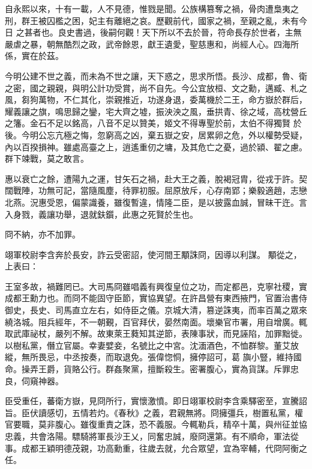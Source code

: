 \begin{pinyinscope}
 自永熙以來，十有一載，人不見德，惟戮是聞。公族構篡奪之禍，骨肉遭梟夷之刑，群王被囚檻之困，妃主有離絕之哀。歷觀前代，國家之禍，至親之亂，未有今日
 之甚者也。良史書過，後嗣何觀！天下所以不去於晉，符命長存於世者，主無嚴虐之暴，朝無酷烈之政，武帝餘恩，獻王遺愛，聖慈惠和，尚經人心。四海所係，實在於茲。



 今明公建不世之義，而未為不世之讓，天下惑之，思求所悟。長沙、成都，魯、衛之密，國之親親，與明公計功受賞，尚不自先。今公宜放桓、文之勳，邁臧、札之風，芻狗萬物，不仁其化，崇親推近，功遂身退，委萬機於二王，命方嶽於群后，耀義讓之旗，鳴思歸之鑾，宅大齊之墟，振泱泱之風，垂拱青、徐之域，高枕營丘之籓。金石不足以銘高，八音不足以贊美，姬文不得專聖於前，太伯不得獨賢
 於後。今明公忘亢極之悔，忽窮高之凶，棄五嶽之安，居累卵之危，外以權勢受疑，內以百揆損神。雖處高臺之上，逍遙重仞之墉，及其危亡之憂，過於潁、翟之慮。群下竦戰，莫之敢言。



 惠以衰亡之餘，遭陽九之運，甘矢石之禍，赴大王之義，脫褐冠胄，從戎于許。契闊戰陣，功無可記，當隨風塵，待罪初服。屈原放斥，心存南郢；樂毅適趙，志戀北燕。況惠受恩，偏蒙識養，雖復暫違，情隆二臣，是以披露血誠，冒昧干迕。言入身戮，義讓功舉，退就鈇鑕，此惠之死賢於生也。



 冏不納，亦不加罪。



 翊軍校尉李含奔於長安，詐云受密詔，使河間王顒誅冏，因導以利謀。
 顒從之，上表曰：



 王室多故，禍難罔已。大司馬冏雖唱義有興復皇位之功，而定都邑，克寧社稷，實成都王勳力也。而冏不能固守臣節，實協異望。在許昌營有東西掖門，官置治書侍御史，長史、司馬直立左右，如侍臣之儀。京城大清，篡逆誅夷，而率百萬之眾來繞洛城。阻兵經年，不一朝覲，百官拜伏，晏然南面。壞樂官市署，用自增廣。輒取武庫祕杖，嚴列不解。故東萊王蕤知其逆節，表陳事狀，而見誣陷，加罪黜徙。以樹私黨，僭立官屬。幸妻嬖妾，名號比之中宮。沈湎酒色，不恤群黎。董艾放縱，無所畏忌，中丞按奏，而取退免。張偉惚恫，擁停詔可，葛
 旟小豎，維持國命。操弄王爵，貨賂公行。群姦聚黨，擅斷殺生。密署腹心，實為貨謀。斥罪忠良，伺窺神器。



 臣受重任，蕃衛方嶽，見冏所行，實懷激憤。即日翊軍校尉李含乘驛密至，宣騰詔旨。臣伏讀感切，五情若灼。《春秋》之義，君親無將。冏擁彊兵，樹置私黨，權官要職，莫非腹心。雖復重責之誅，恐不義服。今輒勒兵，精卒十萬，與州征並協忠義，共會洛陽。驃騎將軍長沙王乂，同奮忠誠，廢冏還第。有不順命，軍法從事。成都王穎明德茂親，功高勳重，往歲去就，允合眾望，宜為宰輔，代冏阿衡之任。




\end{pinyinscope}
